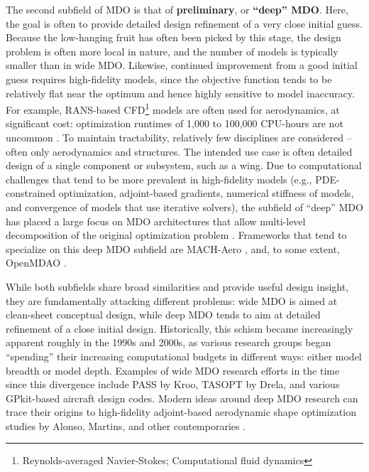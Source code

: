 The second subfield of MDO is that of \textbf{preliminary}, or \textbf{``deep'' MDO}. Here, the goal is often to provide detailed design refinement of a very close initial guess. Because the low-hanging fruit has often been picked by this stage, the design problem is often more local in nature, and the number of models is typically smaller than in wide MDO. Likewise, continued improvement from a good initial guess requires high-fidelity models, since the objective function tends to be relatively flat near the optimum and hence highly sensitive to model inaccuracy. For example, RANS-based CFD\footnote{Reynolds-averaged Navier-Stokes; Computational fluid dynamics} models are often used for aerodynamics, at significant cost: optimization runtimes of 1,000 to 100,000 CPU-hours are not uncommon \cite{kenway_multipoint_2014}. To maintain tractability, relatively few disciplines are considered -- often only aerodynamics and structures. The intended use case is often detailed design of a single component or subsystem, such as a wing. Due to computational challenges that tend to be more prevalent in high-fidelity models (e.g., PDE-constrained optimization, adjoint-based gradients, numerical stiffness of models, and convergence of models that use iterative solvers), the subfield of ``deep'' MDO has placed a large focus on MDO architectures that allow multi-level decomposition of the original optimization problem \cite{martins_multidisciplinary_2013}. Frameworks that tend to specialize on this deep MDO subfield are MACH-Aero \cite{he_aerodynamic_2018}, and, to some extent, OpenMDAO \cite{gray_openmdao_2019}.

While both subfields share broad similarities and provide useful design insight, they are fundamentally attacking different problems: wide MDO is aimed at clean-sheet conceptual design, while deep MDO tends to aim at detailed refinement of a close initial design. Historically, this schism became increasingly apparent roughly in the 1990s and 2000s, as various research groups began ``spending'' their increasing computational budgets in different ways: either model breadth or model depth. Examples of wide MDO research efforts in the time since this divergence include PASS \cite{antoine_framework_2005} by Kroo, TASOPT \cite{drela_tasopt_2010} by Drela, and various GPkit-based \cite{hoburg_geometric_2014} aircraft design codes. Modern ideas around deep MDO research can trace their origins to high-fidelity adjoint-based aerodynamic shape optimization studies by Alonso, Martins, and other contemporaries \cite{alonso_pymdo_2004, martins_coupledadjoint_2005, choi_multifidelity_2008}.

